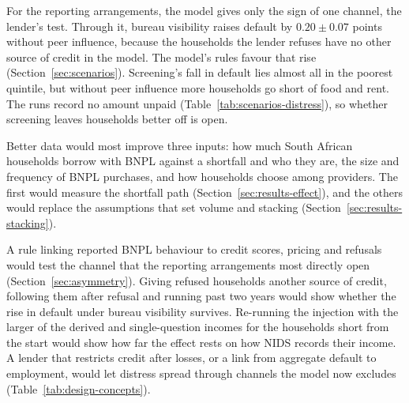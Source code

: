 For the reporting arrangements, the model gives only the sign of one channel, the lender's
test. Through it, bureau visibility raises default by
$0.20 \pm 0.07$ points without peer influence, because the households the lender refuses have no
other source of credit in the model. The model's rules favour that rise
(Section~\ref{sec:scenarios}). Screening's fall in default lies almost all in the poorest
quintile, but without peer influence more households go short of food
and rent. The runs record no amount unpaid (Table~\ref{tab:scenarios-distress}), so whether screening
leaves households better off is open.

Better data would most improve three inputs: how much South African households borrow with
\ac{BNPL} against a shortfall and who they are, the size and frequency of \ac{BNPL} purchases, and
how households choose among providers. The first would measure the shortfall path
(Section~\ref{sec:results-effect}), and the others would replace the assumptions that set volume
and stacking (Section~\ref{sec:results-stacking}).

A rule linking reported \ac{BNPL} behaviour to credit scores, pricing
and refusals would test the channel that the reporting arrangements most directly open
(Section~\ref{sec:asymmetry}). Giving refused households another source of credit, following
them after refusal and running past two years would show whether the rise in default under
bureau visibility survives. Re-running the injection with the larger of the derived and
single-question incomes for the households short from the start would show how far the effect
rests on how \ac{NIDS} records their income. A lender that restricts credit
after losses, or a link from aggregate default to employment, would let distress spread through
channels the model now excludes (Table~\ref{tab:design-concepts}).

